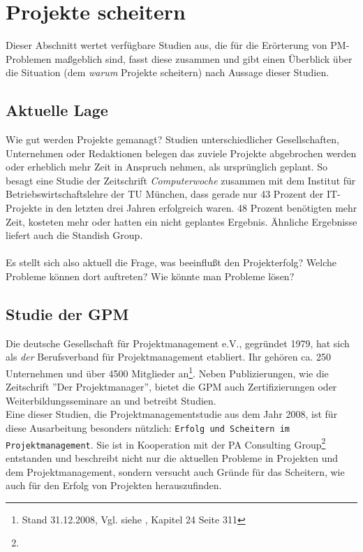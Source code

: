 \documentclass[12pt]{scrartcl}
\begin{document}
\pagebreak
\section{Projekte scheitern}
\label{projekte_scheitern}
Dieser Abschnitt wertet verfügbare Studien aus, die für die Erörterung von PM-Problemen maßgeblich sind, fasst diese zusammen und gibt einen Überblick über die Situation (dem \textit{warum} Projekte scheitern) nach Aussage dieser Studien. 

\subsection{Aktuelle Lage}
Wie gut werden Projekte gemanagt? Studien unterschiedlicher Gesellschaften, Unternehmen oder Redaktionen belegen das zuviele Projekte abgebrochen werden oder erheblich mehr Zeit in Anspruch nehmen, als ursprünglich geplant. So besagt eine Studie der Zeitschrift \textit{Computerwoche} zusammen mit dem Institut für Betriebswirtschaftslehre der TU München, dass gerade nur 43 Prozent der IT-Projekte in den letzten drei Jahren erfolgreich waren. 48 Prozent benötigten mehr Zeit, kosteten mehr oder hatten ein nicht geplantes Ergebnis. Ähnliche Ergebnisse liefert auch die Standish Group. \\
\\
Es stellt sich also aktuell die Frage, was beeinflußt den Projekterfolg? Welche Probleme können dort auftreten? Wie könnte man Probleme lösen?

\subsection{Studie der GPM}
\label{studies_gpm}

Die deutsche Gesellschaft für Projektmanagement e.V., gegründet 1979, hat sich als \textit{der} Berufsverband für Projektmanagement etabliert. Ihr gehören ca. 250 Unternehmen und  über 4500 Mitglieder an\footnote{Stand 31.12.2008, Vgl. siehe \cite{proj_zum_erfolg_fuehren}, Kapitel 24 Seite 311}. Neben Publizierungen, wie die Zeitschrift ''Der Projektmanager'', bietet die GPM auch Zertifizierungen oder Weiterbildungsseminare an und betreibt Studien. \\
Eine dieser Studien, die Projektmanagementstudie aus dem Jahr 2008, ist für diese Ausarbeitung besonders nützlich: \texttt{Erfolg und Scheitern im Projektmanagement}. Sie ist in Kooperation mit der PA Consulting Group\footnote{} entstanden und beschreibt nicht nur die aktuellen Probleme in Projekten und dem Projektmanagement, sondern versucht auch Gründe für das Scheitern, wie auch für den Erfolg von Projekten herauszufinden. 
\end{document}

